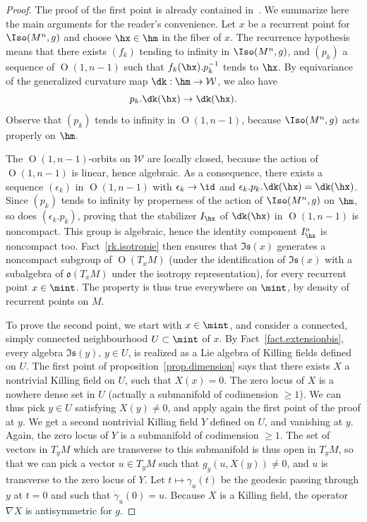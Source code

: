 \begin{proof}
The proof of the first point is already contained in~\cite[Proposition~5.1]{frances.open}. We summarize here the main arguments for the reader's convenience. Let $x$ be a recurrent point for $\Iso(M^n,g)$ and choose $\hx \in \hm$ in the fiber of $x$. The recurrence hypothesis means that there exists $(f_k)$ tending to infinity in $\Iso(M^n,g)$, and $(p_k)$ a sequence of ${\operatorname O}(1,n-1)$ such that $f_k(\hx).p_k^{-1}$ tends to $\hx$. By equivariance of the generalized curvature map $\dk: \hm \to \mathcal{W}$, we also have
\[
p_k.\dk(\hx) \to \dk(\hx).
\]
Observe that $(p_k)$ tends to infinity in ${\operatorname O}(1,n-1)$, because $\Iso(M^n,g)$ acts properly on $\hm$.

The ${\operatorname O}(1,n-1)$-orbits on $\mathcal{W}$ are locally closed, because the action of ${\operatorname O}(1,n-1)$ is linear, hence algebraic. As a consequence, there exists a sequence $(\epsilon_k)$ in ${\operatorname O}(1,n-1)$ with $\epsilon_k \to \id$ and $\epsilon_k.p_k.\dk(\hx) = \dk(\hx)$. Since $(p_k)$ tends to infinity by properness of the action of $\Iso(M^n,g)$ on $\hm$, so does $(\epsilon_k.p_k)$, proving that the stabilizer $I_{\hx}$ of $\dk(\hx)$ in ${\operatorname O}(1,n-1)$ is noncompact. This group is algebraic, hence the identity component $I_{\hx}^{o}$ is noncompact too. Fact~\ref{rk.isotropie} then ensures that $\mathfrak{Is}(x)$ generates a noncompact subgroup of ${\operatorname O}(T_xM)$ (under the identification of $\mathfrak{Is}(x)$ with a subalgebra of $\mathfrak{o}(T_xM)$ under the isotropy representation), for every recurrent point $x \in \mint$. The property is thus true everywhere on $\mint$, by density of recurrent points on $M$.

To prove the second point, we start with $x \in \mint$, and consider a connected, simply connected neighbourhood $U \subset \mint$ of $x$. By Fact~\ref{fact.extensionbis}, every algebra $\mathfrak{Is}(y)$, $y \in U$, is realized as a Lie algebra of Killing fields defined on $U$. The first point of proposition~\ref{prop.dimension} says that there exists $X$ a nontrivial Killing field on $U$, such that $X(x)=0$. The zero locus of $X$ is a nowhere dense set in $U$ (actually a submanifold of codimension $\geq 1$). We can thus pick $y \in U$ satisfying $X(y) \not =0$, and apply again the first point of the proof at $y$. We get a second nontrivial Killing field $Y$ defined on $U$, and vanishing at $y$. Again, the zero locus of $Y$ is a submanifold of codimension $\geq 1$. The set of vectors in $T_yM$ which are transverse to this submanifold is thus open in $T_yM$, so that we can pick a vector $u \in T_yM$ such that $g_y(u,X(y)) \not =0$, and $u$ is transverse to the zero locus of $Y$. Let $t \mapsto \gamma_u(t)$ be the geodesic passing through $y$ at $t =0$ and such that $\dot{\gamma}_u(0)=u$. Because $X$ is a Killing field, the operator $\nabla X$ is antisymmetric for $g$.


\end{proof}
